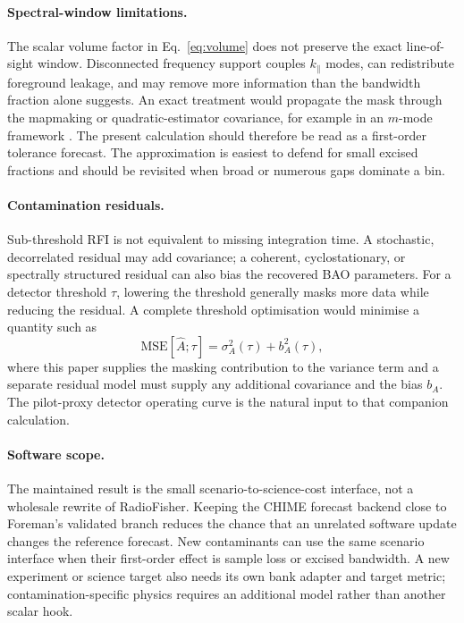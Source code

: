 \paragraph{Spectral-window limitations.}
The scalar volume factor in Eq.~\eqref{eq:volume} does not preserve the
exact line-of-sight window. Disconnected frequency support couples
$k_\parallel$ modes, can redistribute foreground leakage, and may
remove more information than the bandwidth fraction alone suggests. An
exact treatment would propagate the mask through the mapmaking or
quadratic-estimator covariance, for example in an $m$-mode framework
\citep{Shaw2014,Shaw2015}. The present calculation should therefore be
read as a first-order tolerance forecast. The approximation is easiest
to defend for small excised fractions and should be revisited when
broad or numerous gaps dominate a bin.

\paragraph{Contamination residuals.}
Sub-threshold RFI is not equivalent to missing integration time. A
stochastic, decorrelated residual may add covariance; a coherent,
cyclostationary, or spectrally structured residual can also bias the
recovered BAO parameters. For a detector threshold $\tau$, lowering
the threshold generally masks more data while reducing the residual. A
complete threshold optimisation would minimise a quantity such as
\begin{equation}
\label{eq:mse}
\mathrm{MSE}[\widehat{A};\tau] = \sigma_A^2(\tau) + b_A^2(\tau),
\end{equation}
where this paper supplies the masking contribution to the variance term
and a separate residual model must supply any additional covariance and
the bias $b_A$. The pilot-proxy detector operating curve is the
natural input to that companion calculation.

\paragraph{Software scope.}
The maintained result is the small scenario-to-science-cost interface,
not a wholesale rewrite of RadioFisher. Keeping the CHIME forecast
backend close to Foreman's validated branch reduces the chance that an
unrelated software update changes the reference forecast. New contaminants
can use the same scenario interface when their first-order effect is sample
loss or excised bandwidth. A new experiment or science target also needs its
own bank adapter and target metric; contamination-specific physics requires
an additional model rather than another scalar hook.

